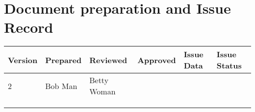 \newpage

\vspace*{1cm}
  
\large
\section*{Document preparation and Issue Record}

\vspace{1.5cm}
\begin{table}[htb]
\begin{tabular}{p{1cm}p{2cm}p{2cm}p{2cm}p{2cm}p{2cm}}
Version & Prepared & Reviewed & Approved & Issue Data & Issue Status \\
\midrule
2 & Bob Man & Betty Woman &     &   &  \\ \greyrule
    &   &   &   &   & \\ \greyrule
    &   &   &   &   & \\ \greyrule
    &   &   &   &   & \\ 
\bottomrule
\end{tabular}
\end{table}

